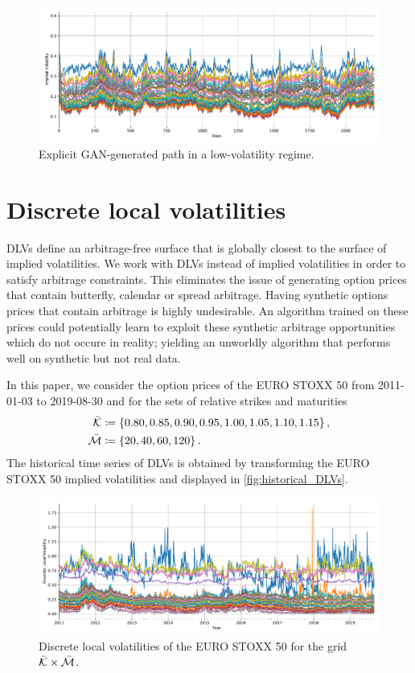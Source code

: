\documentclass[]{article} %
\begin{document}
\begin{figure}[!htb]
	\centering
        \includegraphics[width=\textwidth]{figures/imp_vol/plot/generated_2.pdf}
        \caption{Explicit GAN-generated path in a low-volatility regime.}
       \label{fig:generated_implied_vols2}
\end{figure}
\newpage
\section{Discrete local volatilities}
\setcounter{figure}{0}
\label{appendix:DLVs}
DLVs define an arbitrage-free surface that is globally closest to the surface of implied volatilities. We work with DLVs instead of implied volatilities in order to satisfy arbitrage constraints. This eliminates the issue of generating option prices that contain butterfly, calendar or spread arbitrage. Having synthetic options prices that contain arbitrage is highly undesirable. An algorithm trained on these prices could potentially learn to exploit these synthetic arbitrage opportunities which do not occure in reality; yielding an unworldly algorithm that performs well on synthetic but not real data.

In this paper, we consider the option prices of the EURO STOXX 50 from 2011-01-03 to 2019-08-30 and for the sets of relative strikes and maturities
\begin{align*}
\bar{\mathcal{K}} &\coloneqq \left\lbrace 0.80, 0.85, 0.90, 0.95, 1.00, 1.05, 1.10, 1.15\right\rbrace,\\
\bar{\mathcal{M}} &\coloneqq \left\lbrace 20, 40, 60, 120 \right\rbrace.
\end{align*}
The historical time series of DLVs is obtained by transforming the EURO STOXX 50 implied volatilities and displayed in \autoref{fig:historical_DLVs}. 

\begin{figure}[htp]
        \centering
        \includegraphics[width=\textwidth]{figures/dlvs/historical.pdf}
        \caption{Discrete local volatilities of the EURO STOXX 50 for the grid $\bar {\mathcal{K}} \times \bar {\mathcal{M}}$.}
        \label{fig:historical_DLVs}
\end{figure}
\end{document}
